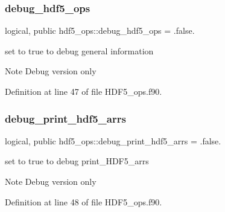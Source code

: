 \subsubsection{\texorpdfstring{debug\+\_\+hdf5\+\_\+ops}{debug\_hdf5\_ops}}
{\footnotesize\ttfamily logical, public hdf5\+\_\+ops\+::debug\+\_\+hdf5\+\_\+ops = .false.}



set to true to debug general information 

\begin{DoxyNote}{Note}
Debug version only 
\end{DoxyNote}


Definition at line 47 of file H\+D\+F5\+\_\+ops.\+f90.

\mbox{\label{namespacehdf5__ops_a00bbaa77652e040350c9726668cc22ac}} 
\subsubsection{\texorpdfstring{debug\+\_\+print\+\_\+hdf5\+\_\+arrs}{debug\_print\_hdf5\_arrs}}
{\footnotesize\ttfamily logical, public hdf5\+\_\+ops\+::debug\+\_\+print\+\_\+hdf5\+\_\+arrs = .false.}



set to true to debug print\+\_\+\+H\+D\+F5\+\_\+arrs 

\begin{DoxyNote}{Note}
Debug version only 
\end{DoxyNote}


Definition at line 48 of file H\+D\+F5\+\_\+ops.\+f90.

